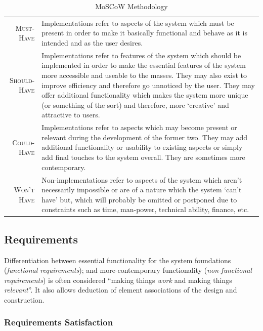 \documentclass[11pt, english]{article}
\begin{document}
	\begin{table}[h]
		\scriptsize
		\renewcommand{\arraystretch}{1.25}
	\begin{center}
	\begin{tabular}{r|p{11cm}}
		\hline
		\hline
		\textsc{Must-Have} & Implementations refer to aspects of the system which must be present in order to make it basically functional and behave as it is intended and as the user desires.\\
		\textsc{Should-Have} & Implementations refer to features of the system which should be implemented in order to make the essential features of the system more accessible and useable to the masses. They may also exist to improve efficiency and therefore go unnoticed by the user. They may offer additional functionality which makes the system more unique (or something of the sort) and therefore, more `creative' and attractive to users.\\
		\textsc{Could-Have} & Implementations refer to aspects which may become present or relevant during the development of the former two. They may add additional functionality or usability to existing aspects or simply add final touches to the system overall. They are sometimes more contemporary.\\
		\textsc{Won't Have} & Non-implementations refer to aspects of the system which aren't necessarily impossible or are of a nature which the system `can't have' but, which will probably be omitted or postponed due to constraints such as time, man-power, technical ability, finance, etc.\\
		\hline
		\hline
	\end{tabular}
		\caption{MoSCoW Methodology}
	\end{center}
	\end{table}

\newpage

	\subsection{Requirements}

	Differentiation between essential functionality for the system foundations (\textit{functional requirements}); and more-contemporary functionality (\textit{non-functional requirements}) is often considered ``making things \textit{work} and making things \textit{relevant}''. It also allows deduction of element associations of the design and construction.

		\subsubsection{Requirements Satisfaction}
\end{document}
